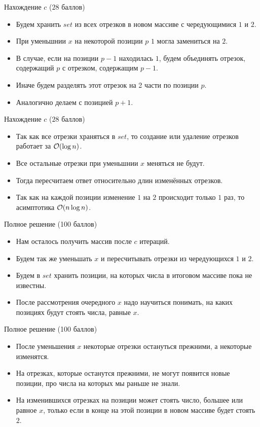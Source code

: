 \begin{frame}{Нахождение $c$ ($28$ баллов)}
  \begin{itemize}
  \item Будем хранить $set$ из всех отрезков в новом массиве с чередующимися $1$ и $2$.
  \item При уменьшнии $x$ на некоторой позиции $p$ $1$ могла замениться на $2$.
  \item В случае, если на позиции $p - 1$ находилась $1$, будем объединять отрезок, содержащий $p$ с отрезком, содержащим $p - 1$.
  \item Иначе будем разделять этот отрезок на 2 части по позиции $p$.
  \item Аналогично делаем с позицией $p + 1$.
  \end{itemize}
\end{frame}

\begin{frame}{Нахождение $c$ ($28$ баллов)}
  \begin{itemize}
  \item Так как все отрезки храняться в $set$, то создание или удаление отрезков работает за $\mathcal{O}(\log n)$.
  \item Все остальные отрезки при уменьшнии $x$ меняться не будут.
  \item Тогда пересчитаем ответ относительно длин изменённых отрезков.
  \item Так как на каждой позиции изменение $1$ на $2$ происходит только $1$ раз, то асимптотика $\mathcal{O}(n \log n)$.
  \end{itemize}
\end{frame}

\begin{frame}{Полное решение (100 баллов)}
  \begin{itemize}
  \item Нам осталось получить массив после $c$ итераций.
  \item Будем так же уменьшать $x$ и пересчитывать отрезки из чередующихся $1$ и $2$.
  \item Будем в $set$ хранить позиции, на которых числа в итоговом массиве пока не известны.
  \item После рассмотрения очередного $x$ надо научиться понимать, на каких позициях будут стоять числа, равные $x$.
  \end{itemize}
\end{frame}

\begin{frame}{Полное решение (100 баллов)}
  \begin{itemize}
  \item После уменьшения $x$ некоторые отрезки остануться прежними, а некоторые изменятся.
  \item На отрезках, которые останутся прежними, не могут появится новые позиции, про числа на которых мы раньше не знали.
  \item На изменившихся отрезках на позиции может стоять число, большее или равное $x$, только если в конце на этой позиции в новом массиве будет стоять $2$.
  \end{itemize}
\end{frame}

